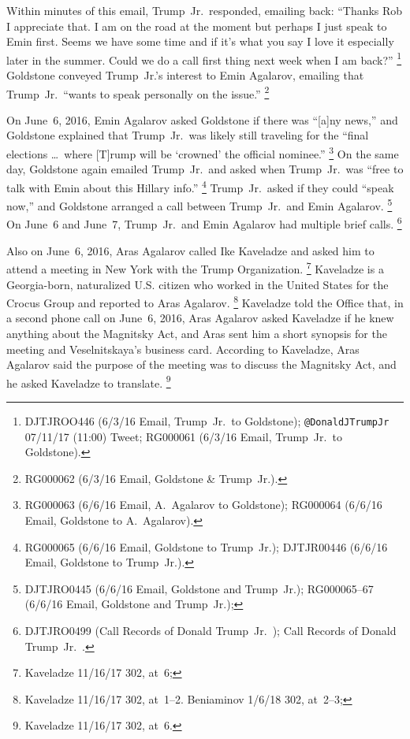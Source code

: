 Within minutes of this email, Trump~Jr.\ responded, emailing back: ``Thanks Rob I appreciate that.
I am on the road at the moment but perhaps I just speak to Emin first.
Seems we have some time and if it's what you say I love it especially later in the summer.
Could we do a call first thing next week when I am back?''%
\footnote{DJTJROO446 (6/3/16 Email, Trump~Jr.\ to Goldstone);
\verb+@DonaldJTrumpJr+ 07/11/17 (11:00) Tweet;
RG000061 (6/3/16 Email, Trump~Jr.\ to Goldstone).}
Goldstone conveyed Trump~Jr.'s interest to Emin Agalarov, emailing that Trump~Jr.\ ``wants to speak personally on the issue.''%
\footnote{ RG000062 (6/3/16 Email, Goldstone \& Trump~Jr.).}

On June~6, 2016, Emin Agalarov asked Goldstone if there was ``[a]ny news,'' and Goldstone explained that Trump~Jr.\ was likely still traveling for the ``final elections \dots\ where [T]rump will be `crowned' the official nominee.''%
\footnote{RG000063 (6/6/16 Email, A.~Agalarov to Goldstone);
RG000064 (6/6/16 Email, Goldstone to A.~Agalarov).}
On the same day, Goldstone again emailed Trump~Jr.\ and asked when Trump~Jr.\ was ``free to talk with Emin about this Hillary info.''%
\footnote{RG000065 (6/6/16 Email, Goldstone to Trump~Jr.);
DJTJR00446 (6/6/16 Email, Goldstone to Trump~Jr.).}
Trump~Jr.\ asked if they could ``speak now,'' and Goldstone arranged a call between Trump~Jr.\ and Emin Agalarov.%
\footnote{DJTJRO0445 (6/6/16 Email, Goldstone and Trump~Jr.);
RG000065--67 (6/6/16 Email, Goldstone and Trump~Jr.);
}
On June~6 and June~7, Trump~Jr.\ and Emin Agalarov had multiple brief calls.%
\footnote{DJTJRO0499 (Call Records of Donald Trump~Jr.\ );
Call Records of Donald Trump~Jr.\ .}

Also on June~6, 2016, Aras Agalarov called Ike Kaveladze and asked him to attend a meeting in New York with the Trump Organization.%
\footnote{Kaveladze 11/16/17 302, at~6; }
Kaveladze is a Georgia-born, naturalized U.S. citizen who worked in the United States for the Crocus Group and reported to Aras Agalarov.%
\footnote{Kaveladze 11/16/17 302, at~1--2.
 Beniaminov 1/6/18 302, at~2--3;
}
Kaveladze told the Office that, in a second phone call on June~6, 2016, Aras Agalarov asked Kaveladze if he knew anything about the Magnitsky Act, and Aras sent him a short synopsis for the meeting and Veselnitskaya's business card.
According to Kaveladze, Aras Agalarov said the purpose of the meeting was to discuss the Magnitsky Act, and he asked Kaveladze to translate.%
\footnote{Kaveladze 11/16/17 302, at~6.}

